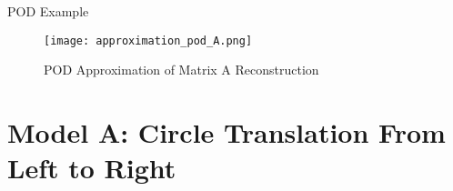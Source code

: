 \documentclass[aspectratio=169,xcolor=dvipsnames]{beamer}
\begin{document}
\begin{frame}{POD Example}
\begin{figure}
    \centering
    \texttt{[image: approximation\_pod\_A.png]}
    \label{fig:pod_ex}
    \caption{POD Approximation of Matrix A Reconstruction}
\end{figure}
\end{frame}







\section{Model A: Circle Translation From Left to Right}
\end{document}
